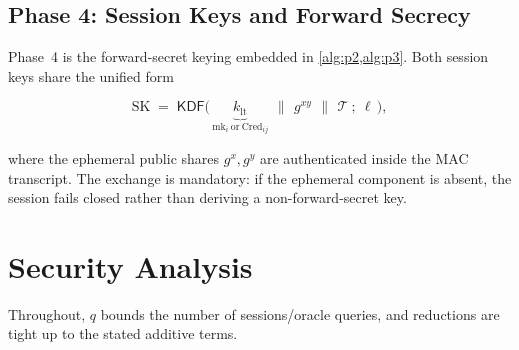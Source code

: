 \documentclass[11pt,a4paper]{article}
\theoremstyle{jrnlplain}
\theoremstyle{jrnldef}
\newcommand{\Cred}{\mathrm{Cred}}
\newcommand{\mk}{\mathrm{mk}}
\newcommand{\SK}{\mathrm{SK}}
\newcommand{\KDF}{\mathsf{KDF}}
\newcommand{\catt}{\,\|\,}
\newcommand{\transcript}{\mathcal{T}}
\begin{document}
\subsection{Phase 4: Session Keys and Forward Secrecy}
\label{sec:p4}
Phase~4 is the forward-secret keying embedded in \cref{alg:p2,alg:p3}. Both
session keys share the unified form

\begin{mdframed}[backgroundcolor=boxbg,linecolor=boxln,linewidth=0.8pt,
  roundcorner=4pt,innertopmargin=8pt,innerbottommargin=8pt]
\begin{equation}
\SK \;=\; \KDF\Big(\,
   \underbrace{k_{\mathrm{lt}}}_{\mk_i\ \text{or}\ \Cred_{ij}}
   \ \catt\ g^{xy}\ \catt\ \transcript\ ;\ \ell \,\Big),
\label{eq:sk}
\end{equation}
\end{mdframed}

\noindent
where the ephemeral public shares $g^{x},g^{y}$ are authenticated inside the
MAC transcript. The exchange is mandatory: if the ephemeral component is
absent, the session fails closed rather than deriving a non-forward-secret
key.

\section{Security Analysis}
\label{sec:proofs}
Throughout, $q$ bounds the number of sessions/oracle queries, and reductions
are tight up to the stated additive terms.
\end{document}
